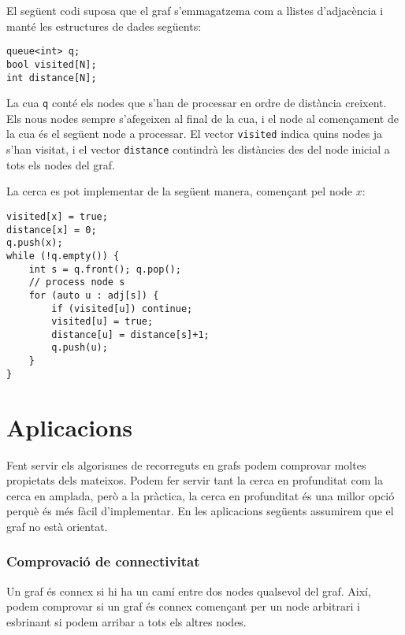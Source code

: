 El següent codi suposa que el graf s'emmagatzema com a llistes
d'adjacència i manté les estructures de dades següents:
\begin{lstlisting}
queue<int> q;
bool visited[N];
int distance[N];
\end{lstlisting}


La cua \texttt{q} conté els nodes que s'han de processar en ordre de
distància creixent. Els nous nodes sempre s'afegeixen al final de la
cua, i el node al començament de la cua és el següent node a
processar. El vector \texttt{visited} indica quins nodes ja s'han
visitat, i el vector \texttt{distance} contindrà les distàncies des
del node inicial a tots els nodes del graf.

La cerca es pot implementar de la següent manera, començant pel node
$x$:
\begin{lstlisting}
visited[x] = true;
distance[x] = 0;
q.push(x);
while (!q.empty()) {
    int s = q.front(); q.pop();
    // process node s
    for (auto u : adj[s]) {
        if (visited[u]) continue;
        visited[u] = true;
        distance[u] = distance[s]+1;
        q.push(u);
    }
}
\end{lstlisting}


\section{Aplicacions}

Fent servir els algorismes de recorreguts en grafs podem comprovar
moltes propietats dels mateixos. Podem fer servir tant la
cerca en profunditat com la cerca en amplada, però a la pràctica,
la cerca en profunditat és una millor opció perquè és més fàcil
d'implementar. En les aplicacions següents assumirem que el graf no
està orientat.

\subsubsection{Comprovació de connectivitat}


Un graf és connex si hi ha un camí entre dos nodes qualsevol del
graf. Així, podem comprovar si un graf és connex començant per un
node arbitrari i esbrinant si podem arribar a tots els altres nodes.

